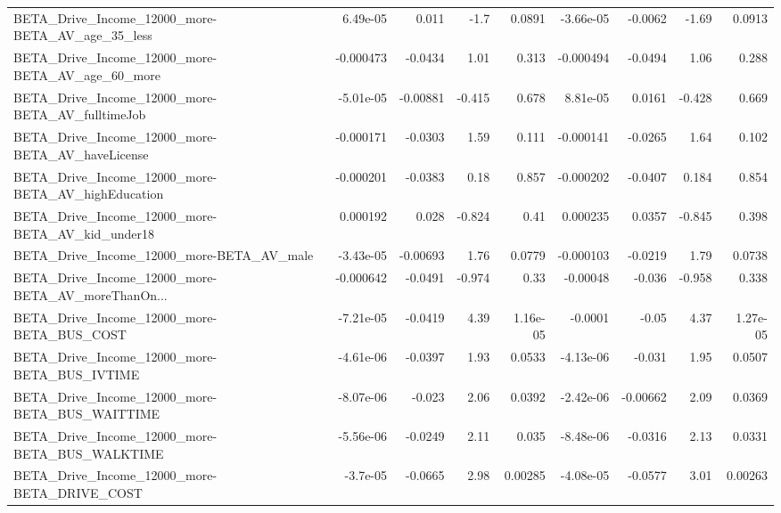 \begin{tabular}{lrrrrrrrr}
BETA\_Drive\_Income\_12000\_more-BETA\_AV\_age\_35\_less   &    6.49e-05 &        0.011 &      -1.7 &   0.0891 &  -3.66e-05 &     -0.0062 &        -1.69 &        0.0913 \\
BETA\_Drive\_Income\_12000\_more-BETA\_AV\_age\_60\_more   &   -0.000473 &      -0.0434 &      1.01 &    0.313 &  -0.000494 &     -0.0494 &         1.06 &         0.288 \\
BETA\_Drive\_Income\_12000\_more-BETA\_AV\_fulltimeJob   &   -5.01e-05 &     -0.00881 &    -0.415 &    0.678 &   8.81e-05 &      0.0161 &       -0.428 &         0.669 \\
BETA\_Drive\_Income\_12000\_more-BETA\_AV\_haveLicense   &   -0.000171 &      -0.0303 &      1.59 &    0.111 &  -0.000141 &     -0.0265 &         1.64 &         0.102 \\
BETA\_Drive\_Income\_12000\_more-BETA\_AV\_highEducation &   -0.000201 &      -0.0383 &      0.18 &    0.857 &  -0.000202 &     -0.0407 &        0.184 &         0.854 \\
BETA\_Drive\_Income\_12000\_more-BETA\_AV\_kid\_under18   &    0.000192 &        0.028 &    -0.824 &     0.41 &   0.000235 &      0.0357 &       -0.845 &         0.398 \\
BETA\_Drive\_Income\_12000\_more-BETA\_AV\_male          &   -3.43e-05 &     -0.00693 &      1.76 &   0.0779 &  -0.000103 &     -0.0219 &         1.79 &        0.0738 \\
BETA\_Drive\_Income\_12000\_more-BETA\_AV\_moreThanOn... &   -0.000642 &      -0.0491 &    -0.974 &     0.33 &   -0.00048 &      -0.036 &       -0.958 &         0.338 \\
BETA\_Drive\_Income\_12000\_more-BETA\_BUS\_COST         &   -7.21e-05 &      -0.0419 &      4.39 & 1.16e-05 &    -0.0001 &       -0.05 &         4.37 &      1.27e-05 \\
BETA\_Drive\_Income\_12000\_more-BETA\_BUS\_IVTIME       &   -4.61e-06 &      -0.0397 &      1.93 &   0.0533 &  -4.13e-06 &      -0.031 &         1.95 &        0.0507 \\
BETA\_Drive\_Income\_12000\_more-BETA\_BUS\_WAITTIME     &   -8.07e-06 &       -0.023 &      2.06 &   0.0392 &  -2.42e-06 &    -0.00662 &         2.09 &        0.0369 \\
BETA\_Drive\_Income\_12000\_more-BETA\_BUS\_WALKTIME     &   -5.56e-06 &      -0.0249 &      2.11 &    0.035 &  -8.48e-06 &     -0.0316 &         2.13 &        0.0331 \\
BETA\_Drive\_Income\_12000\_more-BETA\_DRIVE\_COST       &    -3.7e-05 &      -0.0665 &      2.98 &  0.00285 &  -4.08e-05 &     -0.0577 &         3.01 &       0.00263 \\

\end{tabular}

